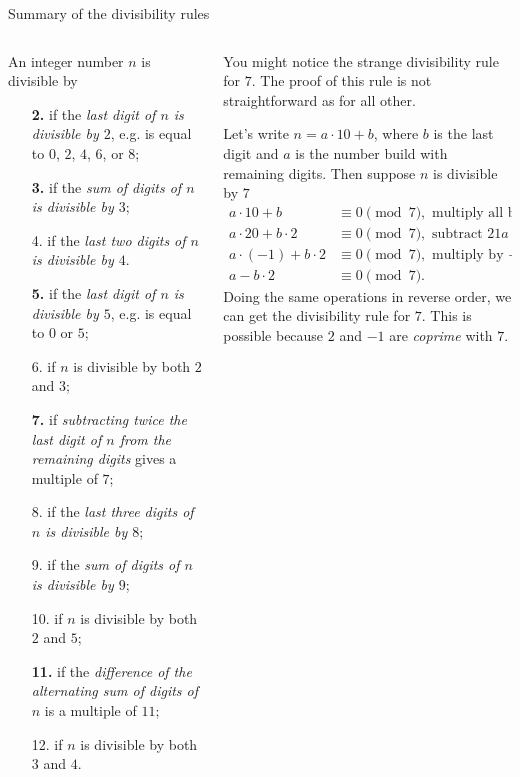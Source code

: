 \documentclass[9pt,aspectratio=169]{beamer}
\begin{document}
\begin{frame}{Summary of the divisibility rules}
  \begin{columns}[T]
    \begin{column}{0.5\textwidth}
      An integer number $n$ is divisible by
      \begin{enumerate}
        \item[\textbf{2.}] if the \emph{last digit of $n$ is divisible by $2$}, e.g. is equal to $0$, $2$, $4$, $6$, or $8$;
        \item[\textbf{3.}] if the \emph{sum of digits of $n$ is divisible by $3$};
        \item[4.] if the \emph{last two digits of $n$ is divisible by $4$}.\item[\textbf{5.}] if the \emph{last digit of $n$ is divisible by $5$}, e.g. is equal to $0$ or $5$;
        \item[6.] if $n$ is divisible by both $2$ and $3$;
        \item[\textbf{7.}] if \emph{subtracting twice the last digit of $n$ from the remaining digits} gives a multiple of $7$;
        \item[8.] if the \emph{last three digits of $n$ is divisible by $8$};
        \item[9.] if the \emph{sum of digits of $n$ is divisible by $9$};
        \item[10.] if $n$ is divisible by both $2$ and $5$;
        \item[\textbf{11.}] if the \emph{difference of the alternating sum of digits of $n$} is a multiple of $11$;
        \item[12.] if $n$ is divisible by both $3$ and $4$.
      \end{enumerate}
    \end{column}
    \begin{column}{0.5\textwidth}
      {\small
      You might notice the strange divisibility rule for $7$. The proof of this rule is not straightforward as for all other. 
      
      Let's write $n = a\cdot 10 + b$, where $b$ is the last digit and $a$ is the number build with remaining digits. Then suppose $n$ is divisible by $7$
      \begin{align*}
        a \cdot 10 + b &\equiv 0 \pmod{7}, \text{ multiply all by $2$}\\
        a \cdot 20 + b \cdot 2 &\equiv 0 \pmod{7}, \text{ subtract $21a$}\\
        a \cdot (-1) + b \cdot 2 &\equiv 0 \pmod{7}, \text{ multiply by $-1$}\\
        a - b \cdot 2 &\equiv 0 \pmod{7}.
      \end{align*}
      Doing the same operations in reverse order, we can get the divisibility rule for $7$. This is possible because $2$ and $-1$ are \emph{coprime} with $7$. 
      
}
\end{column}
\end{columns}
\end{frame}
\end{document}
